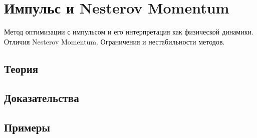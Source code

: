 
\section{Импульс и Nesterov Momentum}
\label{sec:2.5.01-momentum-nesterov}

\begin{ticket}
Метод оптимизации с импульсом и его интерпретация как физической динамики. Отличия Nesterov Momentum. Ограничения и нестабильности методов.
\end{ticket}

\subsection*{Теория}

\subsection*{Доказательства}

\subsection*{Примеры}
